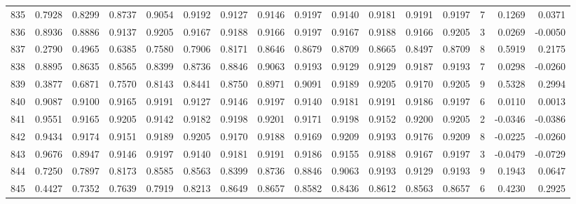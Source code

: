 \begin{tabular}{lrrrrrrrrrrrrrrr}
835 &      0.7928 &  0.8299 &  0.8737 &  0.9054 &  0.9192 &  0.9127 &  0.9146 &  0.9197 &  0.9140 &  0.9181 &   0.9191 &     0.9197 &      7 &                    0.1269 &                     0.0371 \\
836 &      0.8936 &  0.8886 &  0.9137 &  0.9205 &  0.9167 &  0.9188 &  0.9166 &  0.9197 &  0.9167 &  0.9188 &   0.9166 &     0.9205 &      3 &                    0.0269 &                    -0.0050 \\
837 &      0.2790 &  0.4965 &  0.6385 &  0.7580 &  0.7906 &  0.8171 &  0.8646 &  0.8679 &  0.8709 &  0.8665 &   0.8497 &     0.8709 &      8 &                    0.5919 &                     0.2175 \\
838 &      0.8895 &  0.8635 &  0.8565 &  0.8399 &  0.8736 &  0.8846 &  0.9063 &  0.9193 &  0.9129 &  0.9129 &   0.9187 &     0.9193 &      7 &                    0.0298 &                    -0.0260 \\
839 &      0.3877 &  0.6871 &  0.7570 &  0.8143 &  0.8441 &  0.8750 &  0.8971 &  0.9091 &  0.9189 &  0.9205 &   0.9170 &     0.9205 &      9 &                    0.5328 &                     0.2994 \\
840 &      0.9087 &  0.9100 &  0.9165 &  0.9191 &  0.9127 &  0.9146 &  0.9197 &  0.9140 &  0.9181 &  0.9191 &   0.9186 &     0.9197 &      6 &                    0.0110 &                     0.0013 \\
841 &      0.9551 &  0.9165 &  0.9205 &  0.9142 &  0.9182 &  0.9198 &  0.9201 &  0.9171 &  0.9198 &  0.9152 &   0.9200 &     0.9205 &      2 &                   -0.0346 &                    -0.0386 \\
842 &      0.9434 &  0.9174 &  0.9151 &  0.9189 &  0.9205 &  0.9170 &  0.9188 &  0.9169 &  0.9209 &  0.9193 &   0.9176 &     0.9209 &      8 &                   -0.0225 &                    -0.0260 \\
843 &      0.9676 &  0.8947 &  0.9146 &  0.9197 &  0.9140 &  0.9181 &  0.9191 &  0.9186 &  0.9155 &  0.9188 &   0.9167 &     0.9197 &      3 &                   -0.0479 &                    -0.0729 \\
844 &      0.7250 &  0.7897 &  0.8173 &  0.8585 &  0.8563 &  0.8399 &  0.8736 &  0.8846 &  0.9063 &  0.9193 &   0.9129 &     0.9193 &      9 &                    0.1943 &                     0.0647 \\
845 &      0.4427 &  0.7352 &  0.7639 &  0.7919 &  0.8213 &  0.8649 &  0.8657 &  0.8582 &  0.8436 &  0.8612 &   0.8563 &     0.8657 &      6 &                    0.4230 &                     0.2925 \\

\end{tabular}
